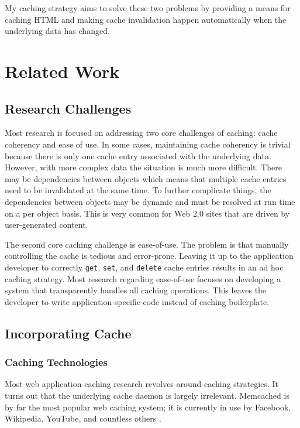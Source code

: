 \documentclass[12pt]{ucthesis}
\begin{document}
My caching strategy aims to solve these two problems by providing a means for caching HTML and making cache invalidation happen automatically when the underlying data has changed.

\section{Related Work}
\subsection{Research Challenges}
Most research is focused on addressing two core challenges of caching: cache coherency and ease of use.
In some cases, maintaining cache coherency is trivial because there is only one cache entry associated with the underlying data.
However, with more complex data the situation is much more difficult.
There may be dependencies between objects which means that multiple cache entries need to be invalidated at the same time.
To further complicate things, the dependencies between objects may be dynamic and must be resolved at run time on a per object basis.
This is very common for Web 2.0 sites that are driven by user-generated content.

The second core caching challenge is ease-of-use.
The problem is that manually controlling the cache is tedious and error-prone.
Leaving it up to the application developer to correctly {\tt get}, {\tt set}, and {\tt delete} cache entries results in an ad hoc caching strategy.
Most research regarding ease-of-use focuses on developing a system that transparently handles all caching operations.
This leaves the developer to write application-specific code instead of caching boilerplate.

\subsection{Incorporating Cache}
\subsubsection{Caching Technologies}
Most web application caching research revolves around caching strategies.
It turns out that the underlying cache daemon is largely irrelevant.
\textsf{Memcached} is by far the most popular web caching system; it is currently in use by \textsf{Facebook}, \textsf{Wikipedia}, \textsf{YouTube}, and countless others \cite{memcachedDotOrg}.
\end{document}
